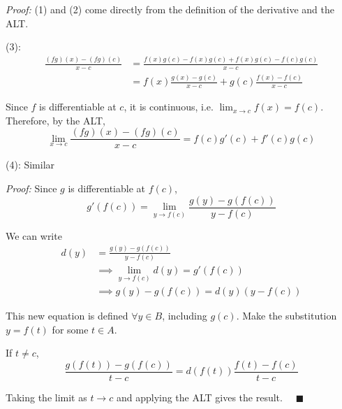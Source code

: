 \documentclass[12pt]{report}
\newcommand{\R}{\mathbb{R}}
\newcommand{\qed}{\quad \blacksquare}
\newenvironment*{tbox}[2][gray]{
    \begin{tcolorbox}[
        parbox=false,
        colback=#1!5!white,
        colframe=#1!75!black,
        breakable,
        title={#2}
    ]}
    {\end{tcolorbox}}
\begin{document}
    \begin{tbox}{\textbf{Algebraic Differentiability Theorem:} Let $f, g$ be defined on an interval $A$ and assume both are differentiable at some point $c \in A$. Then:
        \begin{enumerate}
            \item $(f + g)'(c) = f'(c) + g'(c)$
            \item $(kf)'(c) = kf'(c) \quad \forall k \in \R$ 
            \item $(fg)'(c) = f'(c)g(c) + f(c)g'(c)$
            \item $\left(\frac{f}{g}\right)'(c) = \frac{f'(c)g(c) - f(c)g'(c)}{g^2(c)}$ provided $g(c) \neq 0$
        \end{enumerate} }
        \emph{Proof:} (1) and (2) come directly from the definition of the derivative and the ALT. 

        (3):
        \begin{align*}
            \frac{(fg)(x) - (fg)(c)}{x - c} &= \frac{f(x)g(c) - f(x)g(c) + f(x)g(c) - f(c)g(c)}{x - c}\\ 
            &= f(x) \frac{g(x) - g(c)}{x - c} + g(c) \frac{f(x) - f(c)}{x - c}
        \end{align*}

        Since $f$ is differentiable at $c$, it is continuous, i.e. $\lim_{x \to c} f(x) = f(c)$. Therefore, by the ALT, 
        \[\lim_{x \to c} \frac{(fg)(x) - (fg)(c)}{x - c} = f(c)g'(c) + f'(c)g(c)\]

        (4): Similar
    \end{tbox}

    \begin{tbox}{\textbf{Theorem (Chain Rule):} Let $f: A \to \R$ and $g: B \to \R$ with $f(A) \subseteq B$. If $f$ is differentiable at $c \in A$ and $g$ is differentiable at $f(c) \in B$, then $g \circ f$ is differentiable at $c$ and 
        \[(g \circ f)'(c) = g'(f(c)) \cdot f'(c)\]}
        \emph{Proof:} Since $g$ is differentiable at $f(c)$, 
        \[g'(f(c)) = \lim_{y \to f(c)} \frac{g(y) - g(f(c))}{y - f(c)}\]

        We can write 
        \begin{align*}
            d(y) &= \frac{g(y) - g(f(c))}{y - f(c)} \\ 
                &\implies \lim_{y \to f(c)} d(y) = g'(f(c))\\ 
                &\implies g(y) - g(f(c)) = d(y) (y - f(c))
        \end{align*}

        This new equation is defined $\forall y \in B$, including $g(c)$. Make the substitution $y = f(t)$ for some $t \in A$. 
        
        If $t \neq c$, 
        \[\frac{g(f(t)) - g(f(c))}{t - c} = d(f(t)) \frac{f(t) - f(c)}{t - c}\]

        Taking the limit as $t \to c$ and applying the ALT gives the result. $\qed$ 
    \end{tbox}
\end{document}
